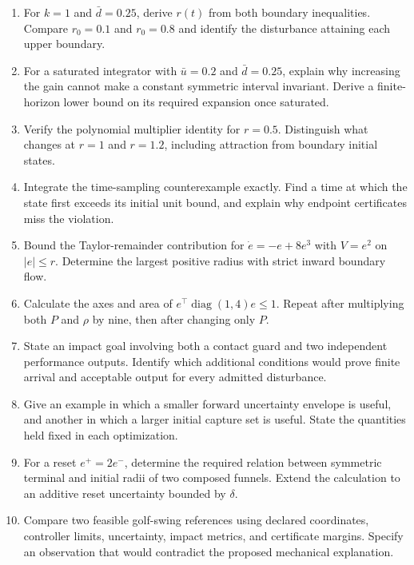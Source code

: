 \begin{enumerate}[itemsep=0.25em,parsep=0pt]
\item For $k=1$ and $\bar d=0.25$, derive $r(t)$ from both boundary inequalities. Compare $r_0=0.1$ and $r_0=0.8$ and identify the disturbance attaining each upper boundary.
\item For a saturated integrator with $\bar u=0.2$ and $\bar d=0.25$, explain why increasing the gain cannot make a constant symmetric interval invariant. Derive a finite-horizon lower bound on its required expansion once saturated.
\item Verify the polynomial multiplier identity for $r=0.5$. Distinguish what changes at $r=1$ and $r=1.2$, including attraction from boundary initial states.
\item Integrate the time-sampling counterexample exactly. Find a time at which the state first exceeds its initial unit bound, and explain why endpoint certificates miss the violation.
\item Bound the Taylor-remainder contribution for $\dot e=-e+8e^3$ with $V=e^2$ on $|e|\leq r$. Determine the largest positive radius with strict inward boundary flow.
\item Calculate the axes and area of $e^\top\operatorname{diag}(1,4)e\leq1$. Repeat after multiplying both $P$ and $\rho$ by nine, then after changing only $P$.
\item State an impact goal involving both a contact guard and two independent performance outputs. Identify which additional conditions would prove finite arrival and acceptable output for every admitted disturbance.
\item Give an example in which a smaller forward uncertainty envelope is useful, and another in which a larger initial capture set is useful. State the quantities held fixed in each optimization.
\item For a reset $e^+=2e^-$, determine the required relation between symmetric terminal and initial radii of two composed funnels. Extend the calculation to an additive reset uncertainty bounded by $\delta$.
\item Compare two feasible golf-swing references using declared coordinates, controller limits, uncertainty, impact metrics, and certificate margins. Specify an observation that would contradict the proposed mechanical explanation.
\end{enumerate}
